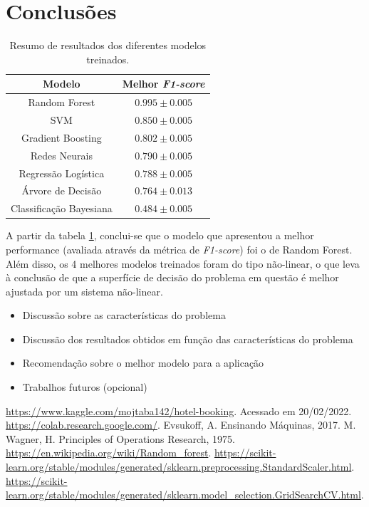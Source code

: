 \documentclass{homework}
\begin{document}
\section{Conclusões}

\begin{table}[h!]
    \centering
    \begin{tabular}{|c|c|}
        \hline
        \textbf{Modelo} & \textbf{Melhor \textit{F1-score}} \\
        \hline
        Random Forest & $0.995 \pm 0.005$ \\
        \hline
        SVM & $0.850 \pm 0.005$ \\
        \hline
        Gradient Boosting & $0.802 \pm 0.005$ \\
        \hline
        Redes Neurais & $0.790 \pm 0.005$ \\
        \hline
        Regressão Logística & $0.788 \pm 0.005$ \\
        \hline
        Árvore de Decisão & $0.764 \pm 0.013$ \\
        \hline
        Classificação Bayesiana & $0.484 \pm 0.005$ \\
        \hline
    \end{tabular}
    \caption{Resumo de resultados dos diferentes modelos treinados.}
    \label{compiled_results}
\end{table}

A partir da tabela \ref{compiled_results}, conclui-se que o modelo que apresentou a melhor performance (avaliada através
da métrica de \textit{F1-score}) foi o de Random Forest. Além disso, os 4 melhores modelos treinados foram do tipo
não-linear, o que leva à conclusão de que a superfície de decisão do problema em questão é melhor ajustada por um
sistema não-linear.

\begin{itemize}
    \color{red}
        \item Discussão sobre as características do problema
        \item Discussão dos resultados obtidos em função das características do problema
        \item Recomendação sobre o melhor modelo para a aplicação
        \item Trabalhos futuros (opcional)
\end{itemize}

\begin{thebibliography}{1}
     \url{https://www.kaggle.com/mojtaba142/hotel-booking}. Acessado em 20/02/2022.
     \url{https://colab.research.google.com/}.
     Evsukoff, A. Ensinando Máquinas, 2017.
     M. Wagner, H. Principles of Operations Research, 1975.
     \url{https://en.wikipedia.org/wiki/Random_forest}.
     \url{https://scikit-learn.org/stable/modules/generated/sklearn.preprocessing.StandardScaler.html}.
     \url{https://scikit-learn.org/stable/modules/generated/sklearn.model_selection.GridSearchCV.html}.
\end{thebibliography}
\end{document}
